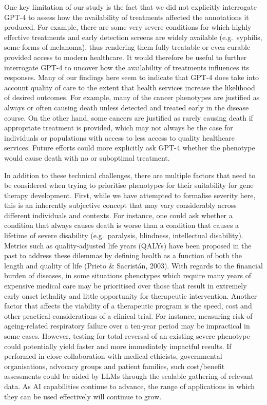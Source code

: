 \documentclass[
]{agujournal2019}
\begin{document}
One key limitation of our study is the fact that we did not explicitly
interrogate GPT-4 to assess how the availability of treatments affected
the annotations it produced. For example, there are some very severe
conditions for which highly effective treatments and early detection
screens are widely available (e.g.~syphilis, some forms of melanoma),
thus rendering them fully treatable or even curable provided access to
modern healthcare. It would therefore be useful to further interrogate
GPT-4 to uncover how the availability of treatments influences its
responses. Many of our findings here seem to indicate that GPT-4 does
take into account quality of care to the extent that health services
increase the likelihood of desired outcomes. For example, many of the
cancer phenotypes are justified as always or often causing death unless
detected and treated early in the disease course. On the other hand,
some cancers are justified as rarely causing death if appropriate
treatment is provided, which may not always be the case for individuals
or populations with access to less access to quality healthcare
services. Future efforts could more explicitly ask GPT-4 whether the
phenotype would cause death with no or suboptimal treatment.

In addition to these technical challenges, there are multiple factors
that need to be considered when trying to prioritise phenotypes for
their suitability for gene therapy development. First, while we have
attempted to formalise severity here, this is an inherently subjective
concept that may vary considerably across different individuals and
contexts. For instance, one could ask whether a condition that always
causes death is worse than a condition that causes a lifetime of severe
disability (e.g.~paralysis, blindness, intellectual disability). Metrics
such as quality-adjusted life years (QALYs) have been proposed in the
past to address these dilemmas by defining health as a function of both
the length and quality of life (Prieto \& Sacristán, 2003). With regards
to the financial burden of diseases, in some situations phenotypes which
require many years of expensive medical care may be prioritised over
those that result in extremely early onset lethality and little
opportunity for therapeutic intervention. Another factor that affects
the viability of a therapeutic program is the speed, cost and other
practical considerations of a clinical trial. For instance, measuring
risk of ageing-related respiratory failure over a ten-year period may be
impractical in some cases. However, testing for total reversal of an
existing severe phenotype could potentially yield faster and more
immediately impactful results. If performed in close collaboration with
medical ethicists, governmental organisations, advocacy groups and
patient families, such cost/benefit assessments could be aided by LLMs
through the scalable gathering of relevant data. As AI capabilities
continue to advance, the range of applications in which they can be used
effectively will continue to grow.
\end{document}
